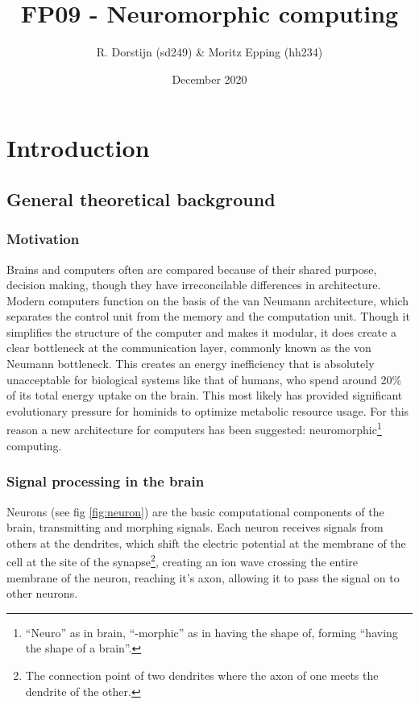 \documentclass[a4paper]{article}
\title{FP09 - Neuromorphic computing}
\author{R. Dorstijn (sd249) \& Moritz Epping (hh234)}
\date{December 2020}
\begin{document}
\maketitle
\clearpage

\section{Introduction}
\subsection{General theoretical background}
\subsubsection{Motivation}
Brains and computers often are compared because of their shared purpose,
decision making, though they have irreconcilable differences in architecture.
Modern computers function on the basis of the van Neumann
architecture\cite{von-Neumann}, which separates the control unit from the memory
and the computation unit. Though it simplifies the structure of the computer and
makes it modular, it does create a clear bottleneck at the communication layer,
commonly known as the von Neumann bottleneck. This creates an energy
inefficiency that is absolutely unacceptable for biological systems like that of
humans, who spend around 20\% of its total energy uptake on the brain\cite{metabolic-rates}.
This most likely has provided significant evolutionary pressure for hominids to
optimize metabolic resource usage\cite{seymour2016fossil}. For this reason a new
architecture for computers has been suggested: neuromorphic\footnote{``Neuro''
as in brain, ``-morphic'' as in having the shape of, forming ``having the shape
of a brain''.} computing.

\subsubsection{Signal processing in the brain}
Neurons (see fig \ref{fig:neuron}) are the basic computational components of the
brain, transmitting and morphing signals. Each neuron receives signals from
others at the dendrites, which shift the electric potential at the membrane of
the cell at the site of the synapse\footnote{The connection point of two
dendrites where the axon of one meets the dendrite of the other.}, creating an
ion wave crossing the entire membrane of the neuron, reaching it's axon,
allowing it to pass the signal on to other neurons.
\end{document}
